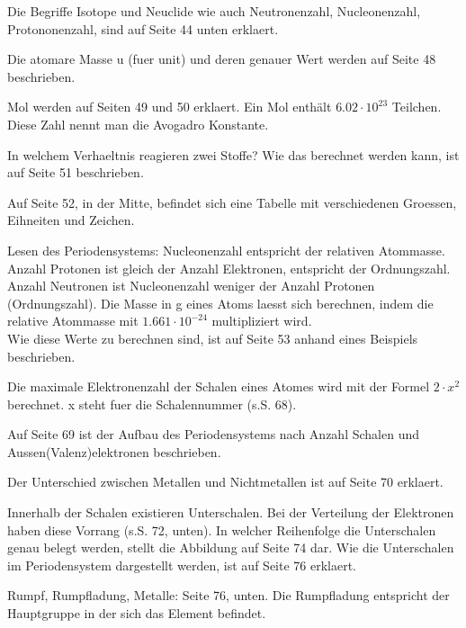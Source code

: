 \documentclass[11pt,paper=a4,final]{scrartcl}
\begin{document}
Die Begriffe Isotope und Neuclide wie auch Neutronenzahl, Nucleonenzahl,
Protononenzahl, sind auf Seite 44 unten erklaert.

Die atomare Masse u (fuer unit) und deren genauer Wert werden auf Seite 48
beschrieben.

Mol werden auf Seiten 49 und 50 erklaert. Ein Mol enth\"alt \(6.02 \cdot
10^{23}\) Teilchen. Diese Zahl nennt man die Avogadro Konstante.

In welchem Verhaeltnis reagieren zwei Stoffe? Wie das berechnet werden kann, ist
auf Seite 51 beschrieben.

Auf Seite 52, in der Mitte, befindet sich eine Tabelle mit verschiedenen
Groessen, Eihneiten und Zeichen.

Lesen des Periodensystems: Nucleonenzahl entspricht der relativen Atommasse.
Anzahl Protonen ist gleich der Anzahl Elektronen, entspricht der Ordnungszahl.
Anzahl Neutronen ist Nucleonenzahl weniger der Anzahl Protonen (Ordnungszahl).
Die Masse in g eines Atoms laesst sich berechnen, indem die relative Atommasse
mit \(1.661 \cdot 10^{-24} \) multipliziert wird.\\ Wie diese Werte zu berechnen
sind, ist auf Seite 53 anhand eines Beispiels beschrieben.


Die maximale Elektronenzahl der Schalen eines Atomes wird mit der Formel \( 2
\cdot x^2 \) berechnet. x steht fuer die Schalennummer (s.S. 68).

Auf Seite 69 ist der Aufbau des Periodensystems nach Anzahl Schalen und
Aussen(Valenz)elektronen beschrieben.

Der Unterschied zwischen Metallen und Nichtmetallen ist auf Seite 70 erklaert.


Innerhalb der Schalen existieren Unterschalen. Bei der Verteilung der Elektronen
haben diese Vorrang (s.S. 72, unten). In welcher Reihenfolge die Unterschalen
genau belegt werden, stellt die Abbildung auf Seite 74 dar. Wie die Unterschalen
im Periodensystem dargestellt werden, ist auf Seite 76 erklaert.

Rumpf, Rumpfladung, Metalle: Seite 76, unten. Die Rumpfladung entspricht der
Hauptgruppe in der sich das Element befindet.
\end{document}
